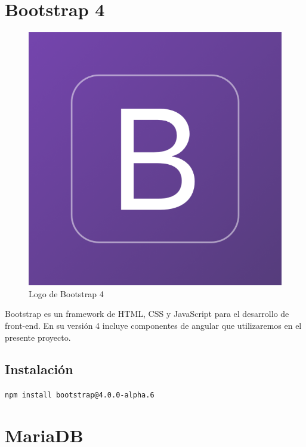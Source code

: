 \documentclass[openright,twoside,10pt]{book}
\begin{document}
    \section{Bootstrap 4}\label{bootstrap-4}
    
    \begin{figure}[H]
        \begin{center}
            \includegraphics[scale=0.15]{img/bootstrap4.png}
        \end{center}
        \caption{Logo de Bootstrap 4}
    \end{figure}
    
    Bootstrap es un framework de HTML, CSS y JavaScript para el desarrollo
    de front-end. En su versión 4 incluye componentes de angular que
    utilizaremos en el presente proyecto.
    
    \subsection{Instalación}\label{instalaciuxf3n-3}
    
    \texttt{npm\ install\ bootstrap@4.0.0-alpha.6}
    
    \section{MariaDB}\label{mariadb}
    
\end{document}
